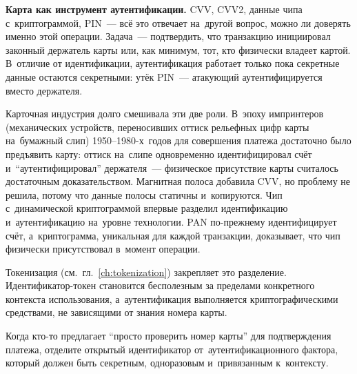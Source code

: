\textbf{Карта как инструмент аутентификации.} CVV, CVV2, данные чипа
с~криптограммой, PIN~--- всё это отвечает на~другой вопрос, можно ли доверять
именно этой операции. Задача~--- подтвердить, что транзакцию инициировал
законный держатель карты или, как минимум, тот, кто физически владеет картой.
В~отличие от идентификации, аутентификация работает только пока секретные
данные остаются секретными: утёк PIN~--- атакующий аутентифицируется вместо
держателя.

Карточная индустрия долго смешивала эти две роли. В~эпоху
импринтеров (механических устройств, переносивших оттиск рельефных цифр карты
на~бумажный слип) 1950--1980-х~годов для совершения платежа достаточно было
предъявить карту: оттиск на~слипе одновременно идентифицировал счёт
и~\enquote{аутентифицировал} держателя~--- физическое присутствие карты
считалось достаточным доказательством. Магнитная полоса добавила CVV, но
проблему не решила, потому что данные полосы статичны и~копируются. Чип
с~динамической криптограммой впервые разделил идентификацию и~аутентификацию
на~уровне технологии. PAN по-прежнему идентифицирует счёт, а~криптограмма,
уникальная для каждой транзакции, доказывает, что чип физически присутствовал
в~момент операции.

Токенизация (см.~гл.~\ref{ch:tokenization}) закрепляет это разделение.
Идентификатор-токен становится бесполезным за пределами конкретного контекста
использования, а~аутентификация выполняется криптографическими средствами,
не зависящими от знания номера карты.

Когда кто-то предлагает \enquote{просто проверить номер карты} для
подтверждения платежа, отделите открытый идентификатор от~аутентификационного фактора, который должен быть секретным, одноразовым
и~привязанным к~контексту.
